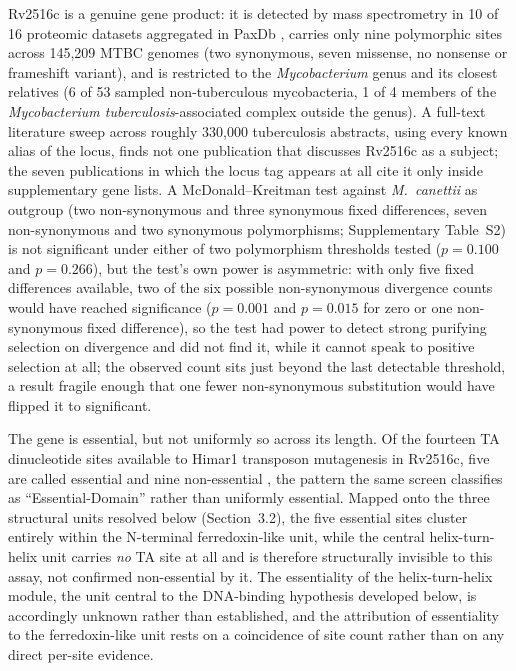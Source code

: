 \documentclass[11pt,a4paper]{article}
\newcommand{\mtb}{\textit{Mycobacterium tuberculosis}}
\begin{document}
Rv2516c is a genuine gene product: it is detected by mass spectrometry in 10 of 16 proteomic
datasets aggregated in PaxDb \citep{huang2023paxdb}, carries only nine polymorphic sites across
145{,}209 MTBC genomes (two synonymous, seven
missense, no nonsense or frameshift variant), and is restricted to the \textit{Mycobacterium} genus
and its closest relatives (6 of 53 sampled non-tuberculous mycobacteria, 1 of 4 members of the
\mtb{}-associated complex outside the genus). A full-text literature sweep across roughly 330{,}000
tuberculosis abstracts, using every known alias of the locus, finds not one publication that
discusses Rv2516c as a subject; the seven publications in which the locus tag appears at all cite
it only inside supplementary gene lists. A McDonald--Kreitman test against \textit{M.\ canettii} as
outgroup (two non-synonymous and three synonymous fixed differences, seven non-synonymous and two
synonymous polymorphisms; Supplementary Table~S2) is not significant under either of two polymorphism thresholds tested
($p=0.100$ and $p=0.266$), but the test's own power is asymmetric: with only five fixed differences
available, two of the six possible non-synonymous divergence counts would have reached significance
($p=0.001$ and $p=0.015$ for zero or one non-synonymous fixed difference), so the test had power to
detect strong purifying selection on divergence and did not find it, while it cannot speak to
positive selection at all; the observed count sits just beyond the last detectable threshold, a
result fragile enough that one fewer non-synonymous substitution would have flipped it to
significant.

The gene is essential, but not uniformly so across its length. Of the fourteen TA dinucleotide
sites available to Himar1 transposon mutagenesis in Rv2516c, five are called essential and nine
non-essential \citep{dejesus2017essentiality}, the pattern the same screen classifies as
``Essential-Domain'' rather than uniformly essential. Mapped onto the three structural units
resolved below (Section~3.2), the five essential sites cluster entirely within the N-terminal
ferredoxin-like unit, while the central helix-turn-helix unit carries \emph{no} TA site at all and
is therefore structurally invisible to this assay, not confirmed non-essential by it. The
essentiality of the helix-turn-helix module, the unit central to the DNA-binding hypothesis
developed below, is accordingly unknown rather than established, and the attribution of
essentiality to the ferredoxin-like unit rests on a coincidence of site count rather than on any
direct per-site evidence.
\end{document}
